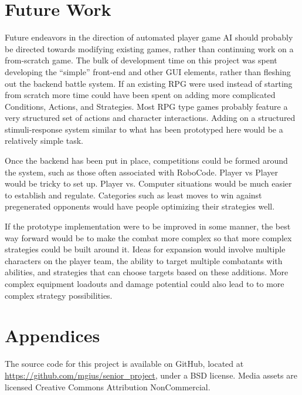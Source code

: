 \documentclass[11pt]{article}
\begin{document}
\section{Future Work}

Future endeavors in the direction of automated player game AI should probably be directed towards modifying existing games, rather than continuing work on a from-scratch game.  The bulk of development time on this project was spent developing the ``simple'' front-end and other GUI elements, rather than fleshing out the backend battle system.  If an existing RPG were used instead of starting from scratch more time could have been spent on adding more complicated Conditions, Actions, and Strategies.  Most RPG type games probably feature a very structured set of actions and character interactions.  Adding on a structured stimuli-response system similar to what has been prototyped here would be a relatively simple task.

Once the backend has been put in place, competitions could be formed around the system, such as those often associated with RoboCode.  Player vs Player would be tricky to set up.  Player vs. Computer situations would be much easier to establish and regulate.  Categories such as least moves to win against pregenerated opponents would have people optimizing their strategies well. 

If the prototype implementation were to be improved in some manner, the best way forward would be to make the combat more complex so that more complex strategies could be built around it.  Ideas for expansion would involve multiple characters on the player team, the ability to target multiple combatants with abilities, and strategies that can choose targets based on these additions. More complex equipment loadouts and damage potential could also lead to to more complex strategy possibilities.

\section{Appendices}

The source code for this project is available on GitHub, located at \url{https://github.com/mgius/senior_project}, under a BSD license.  Media assets are licensed Creative Commons Attribution NonCommercial.



\newpage



\end{document}
